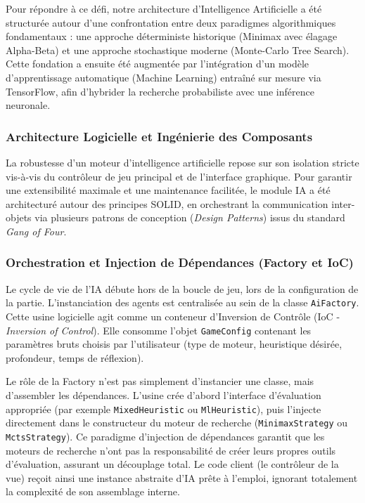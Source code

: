 \documentclass[a4paper]{article}
\begin{document}
Pour répondre à ce défi, notre architecture d'Intelligence Artificielle a été structurée autour d'une confrontation entre deux paradigmes algorithmiques fondamentaux : une approche déterministe historique (Minimax avec élagage Alpha-Beta) et une approche stochastique moderne (Monte-Carlo Tree Search). Cette fondation a ensuite été augmentée par l'intégration d'un modèle d'apprentissage automatique (Machine Learning) entraîné sur mesure via TensorFlow, afin d'hybrider la recherche probabiliste avec une inférence neuronale.

\subsubsection{Architecture Logicielle et Ingénierie des Composants}

La robustesse d'un moteur d'intelligence artificielle repose sur son isolation stricte vis-à-vis du contrôleur de jeu principal et de l'interface graphique. Pour garantir une extensibilité maximale et une maintenance facilitée, le module IA a été architecturé autour des principes SOLID, en orchestrant la communication inter-objets via plusieurs patrons de conception (\textit{Design Patterns}) issus du standard \textit{Gang of Four}.

\subsubsection{Orchestration et Injection de Dépendances (Factory et IoC)}
Le cycle de vie de l'IA débute hors de la boucle de jeu, lors de la configuration de la partie. L'instanciation des agents est centralisée au sein de la classe \texttt{AiFactory}. Cette usine logicielle agit comme un conteneur d'Inversion de Contrôle (IoC - \textit{Inversion of Control}). Elle consomme l'objet \texttt{GameConfig} contenant les paramètres bruts choisis par l'utilisateur (type de moteur, heuristique désirée, profondeur, temps de réflexion).

Le rôle de la Factory n'est pas simplement d'instancier une classe, mais d'assembler les dépendances. L'usine crée d'abord l'interface d'évaluation appropriée (par exemple \texttt{MixedHeuristic} ou \texttt{MlHeuristic}), puis l'injecte directement dans le constructeur du moteur de recherche (\texttt{MinimaxStrategy} ou \texttt{MctsStrategy}). Ce paradigme d'injection de dépendances garantit que les moteurs de recherche n'ont pas la responsabilité de créer leurs propres outils d'évaluation, assurant un découplage total. Le code client (le contrôleur de la vue) reçoit ainsi une instance abstraite d'IA prête à l'emploi, ignorant totalement la complexité de son assemblage interne.
\end{document}

